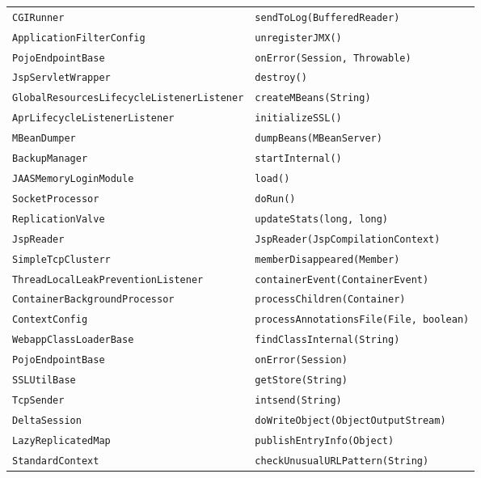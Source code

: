 \begin{center}
\begin{longtable}{ll}
\lstinline/CGIRunner/&{\lstinline/sendToLog(BufferedReader)/}\\
\lstinline/ApplicationFilterConfig/&{\lstinline/unregisterJMX()/}\\
\lstinline/PojoEndpointBase/&{\lstinline/onError(Session, Throwable)/}\\
\lstinline/JspServletWrapper/&{\lstinline/destroy()/}\\
\lstinline/GlobalResourcesLifecycleListenerListener/&{\lstinline/createMBeans(String)/}\\
\lstinline/AprLifecycleListenerListener/&{\hspace*{-3pt}\lstinline/initializeSSL()/}\\
\lstinline/MBeanDumper/&{\lstinline/dumpBeans(MBeanServer)/}\\
\lstinline/BackupManager/&{\hspace*{-3pt}\lstinline/startInternal()/}\\
\lstinline/JAASMemoryLoginModule/&{\lstinline/load()/}\\
\lstinline/SocketProcessor/&{\lstinline/doRun()/}\\
\lstinline/ReplicationValve/&{\lstinline/updateStats(long, long)/}\\
\lstinline/JspReader/&{\lstinline/JspReader(JspCompilationContext)/}\\
\lstinline/SimpleTcpClusterr/&{\lstinline/memberDisappeared(Member)/}\\
\lstinline/ThreadLocalLeakPreventionListener/&{\lstinline/containerEvent(ContainerEvent)/}\\
\lstinline/ContainerBackgroundProcessor/&{\lstinline/processChildren(Container)/}\\
\lstinline/ContextConfig/&{\lstinline/processAnnotationsFile(File, boolean)/}\\
\lstinline/WebappClassLoaderBase/&{\lstinline/findClassInternal(String)/}\\
\lstinline/PojoEndpointBase/&{\lstinline/onError(Session)/}\\
\lstinline/SSLUtilBase/&{\lstinline/getStore(String)/}\\
\lstinline/TcpSender/&{\lstinline/intsend(String)/}\\
\lstinline/DeltaSession/&{\lstinline/doWriteObject(ObjectOutputStream)/}\\
\lstinline/LazyReplicatedMap/&{\lstinline/publishEntryInfo(Object)/}\\
\lstinline/StandardContext/&{\lstinline/checkUnusualURLPattern(String)/}\\

\end{longtable}
\end{center}
